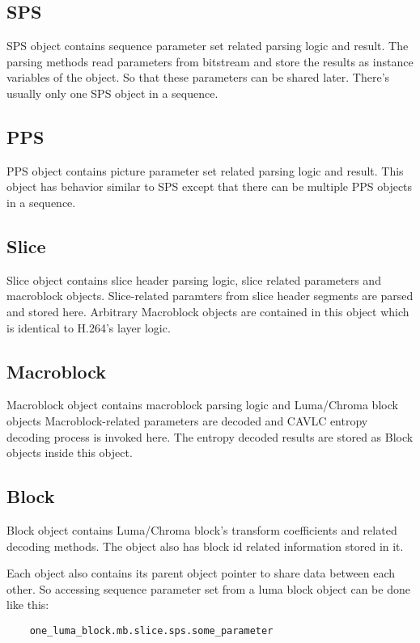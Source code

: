 \documentclass[../main.tex]{subfiles}
\begin{document}
\subsection{SPS}
SPS object contains sequence parameter set related parsing logic and result.
The parsing methods read parameters from bitstream and store the results as instance variables of the object.
So that these parameters can be shared later. 
There's usually only one SPS object in a sequence.

\subsection{PPS}
PPS object contains picture parameter set related parsing logic and result.
This object has behavior similar to SPS except that there can be multiple PPS objects in a sequence.

\subsection{Slice}
Slice object contains slice header parsing logic, slice related parameters and macroblock objects.
Slice-related paramters from slice header segments are parsed and stored here.
Arbitrary Macroblock objects are contained in this object which is identical to H.264's layer logic.

\subsection{Macroblock}
Macroblock object contains macroblock parsing logic and Luma/Chroma block objects
Macroblock-related parameters are decoded and CAVLC entropy decoding process is invoked here.
The entropy decoded results are stored as Block objects inside this object.

\subsection{Block}
Block object contains Luma/Chroma block's transform coefficients and related decoding methods.
The object also has block id related information stored in it.

\bigskip

Each object also contains its parent object pointer to share data between each other.
So accessing sequence parameter set from a luma block object can be done like this:

\begin{verbatim}
    one_luma_block.mb.slice.sps.some_parameter
\end{verbatim}
\end{document}

